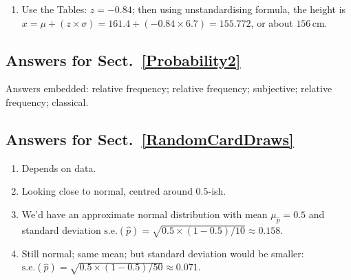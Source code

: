 \documentclass[
  11pt,
  a4paper,
  krantz2]{krantz}
\providecommand{\tightlist}{%
  \setlength{\itemsep}{0pt}\setlength{\parskip}{0pt}}
\begin{document}
\begin{footnotesize}
\begin{enumerate}
  \begin{itemize}
  \tightlist
  \item
    \(z = (171 - 161.4)/6.7 = 1.43\), so the probability is \(0.9236\) or about \(92\)\%.
  \item
    So the odds are \(0.9236/(1 - 0.9236) = 92.36/(100 - 92.36) = 12.1\).
  \item
    The answer is just \(1 - 0.9236 = 0.0764\) or about \(7.6\)\%.
  \item
    The probability of \textbf{over 171cm} is \(7.64\)\%.
  \item
    So the odds are \(7.64/(100 - 7.64)= 0.083\).
  \item
    \(z\)-scores are \(1.28\) and \(2.78\), so the answer is \(0.9973 - 0.8997 = 0.0976\), or about \(9.8\)\%.
  \item
    So the odds are \(9.8/(100 - 9.8) = 0.11\).
  \end{itemize}
\item
  Use the Tables: \(z = -0.84\); then using unstandardising formula, the height is \(x = \mu + (z\times\sigma) = 161.4 + (-0.84\times6.7) = 155.772\), or about \(156\,\text{cm}\).
\end{enumerate}

\subsection*{Answers for Sect.~\ref{Probability2}}\label{answers-for-sect.-refprobability2}

Answers embedded:
relative frequency;
relative frequency;
subjective;
relative frequency;
classical.

\subsection*{Answers for Sect.~\ref{RandomCardDraws}}\label{answers-for-sect.-refrandomcarddraws}

\begin{enumerate}
\def\labelenumi{\arabic{enumi}.}
\tightlist
\item
  Depends on data.
\item
  Looking close to normal, centred around \(0.5\)-ish.
\item
  We'd have an approximate normal distribution with mean \(\mu_{\hat{p}} = 0.5\) and standard deviation \(\text{s.e.}(\hat{p}) = \sqrt{0.5 \times (1 - 0.5)/10} \approx 0.158\).
\item
  Still normal; same mean; but standard deviation would be smaller: \(\text{s.e.}(\hat{p}) = \sqrt{0.5 \times (1 - 0.5)/50} \approx 0.071\).
\end{enumerate}


\end{footnotesize}
\end{document}
